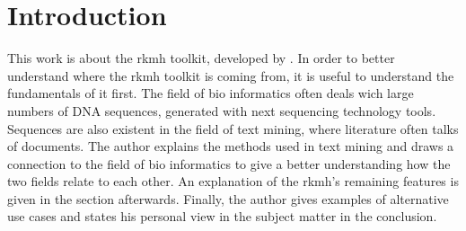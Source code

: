 \section{Introduction}

This work is about the rkmh toolkit, developed by \citeauthor{rkmh} \cite{rkmh}. In order to better understand where the rkmh toolkit is coming from, it is useful to understand the fundamentals of it first. The field of bio informatics often deals wich large numbers of DNA sequences, generated with next sequencing technology tools. Sequences are also existent in the field of text mining, where literature often talks of documents. The author explains the methods used in text mining and draws a connection to the field of bio informatics to give a better understanding how the two fields relate to each other. An explanation of the rkmh's remaining features is given in the section afterwards. Finally, the author gives examples of alternative use cases and states his personal view in the subject matter in the conclusion.